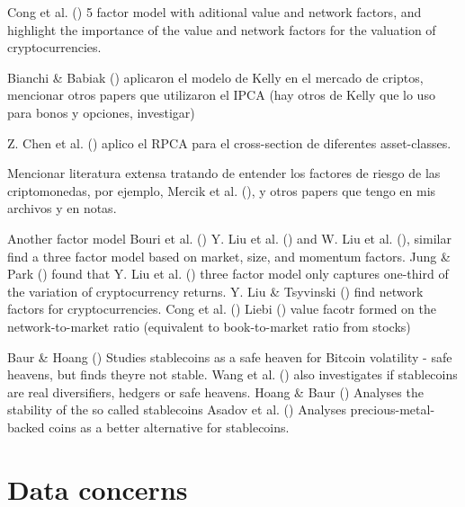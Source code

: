 \documentclass[
  12pt,
  a4paper,
  openany]{scrbook}
\begin{document}
Cong et al. () 5 factor model
with aditional value and network factors, and highlight the importance
of the value and network factors for the valuation of cryptocurrencies.

Bianchi \& Babiak
() aplicaron
el modelo de Kelly en el mercado de criptos, mencionar otros papers que
utilizaron el IPCA (hay otros de Kelly que lo uso para bonos y opciones,
investigar)

Z. Chen et al. () aplico el RPCA
para el cross-section de diferentes asset-classes.

Mencionar literatura extensa tratando de entender los factores de riesgo
de las criptomonedas, por ejemplo, Mercik et al.
(),
y otros papers que tengo en mis archivos y en notas.

Another factor model Bouri et al.
() Y. Liu et al.
() and W. Liu et al.
(), similar find a three factor
model based on market, size, and momentum factors. Jung \& Park
() found that Y. Liu et al.
() three factor model only
captures one-third of the variation of cryptocurrency returns. Y. Liu \&
Tsyvinski () find network
factors for cryptocurrencies. Cong et al.
() Liebi
() value facotr formed on the
network-to-market ratio (equivalent to book-to-market ratio from stocks)

Baur \& Hoang () Studies
stablecoins as a safe heaven for Bitcoin volatility - safe heavens, but
finds theyre not stable. Wang et al.
() also investigates if
stablecoins are real diversifiers, hedgers or safe heavens. Hoang \&
Baur () Analyses the stability of
the so called stablecoins Asadov et al.
() Analyses
precious-metal-backed coins as a better alternative for stablecoins.

\section{Data concerns}\label{data-concerns}
\end{document}

